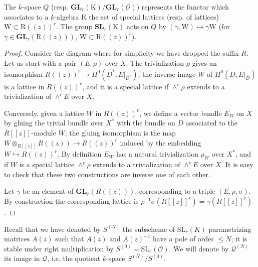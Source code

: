 \documentclass[12pt]{article}
\begin{document}
\begin{proposition}
    The $k$-space $Q$ (resp. $\mathbf{GL}_r(\mathrm{K})/\mathbf{GL}_r(\mathcal{O})$) represents the functor which associates to a $k$-algebra $\mathrm{R}$ the set of special lattices (resp. of lattices) $\mathrm{W} \subset \mathrm{R}((z))^r$. The group $\mathbf{SL}_r(\mathrm{K})$ acts on $Q$ by $(\gamma, \mathrm{W}) \mapsto \gamma \mathrm{W}$ (for $\gamma \in \mathbf{GL}_r(\mathrm{R}((z)))$, $\mathrm{W} \subset \mathrm{R}((z))^r$).
\end{proposition}

\begin{center}
\end{center}

\begin{proof}
    Consider the diagram where for simplicity we have dropped the suffix $R$. Let us start with a pair $(E, \rho)$ over $X$. The trivialization $\rho$ gives an isomorphism $R((z))^r \longrightarrow H^0(D^*, E|_{D^*})$; the inverse image $W$ of $H^0(D, E|_{D})$ is a lattice in $R((z))^r$, and it is a special lattice if $\wedge^r \rho$ extends to a trivialization of $\wedge^r E$ over $X$.

    Conversely, given a lattice $W$ in $R((z))^r$, we define a vector bundle $E_W$ on $X$ by gluing the trivial bundle over $X^*$ with the bundle on $D$ associated to the $R[[z]]$-module $W$; the gluing isomorphism is the map $W \otimes_{R[[z]]} R((z)) \longrightarrow R((z))^r$ induced by the embedding $W \hookrightarrow R((z))^r$. By definition $E_W$ has a natural trivialization $\rho_W$ over $X^*$, and if $W$ is a special lattice $\wedge^r \rho$ extends to a trivialization of $\wedge^r E$ over $X$. It is easy to check that these two constructions are inverse one of each other.

    Let $\gamma$ be an element of $\mathbf{GL}_r(R((z)))$, corresponding to a triple $(E, \rho, \sigma)$. By construction the corresponding lattice is $\rho^{-1} \sigma(R[[z]]^r) = \gamma(R[[z]]^r)$.
\end{proof}

Recall that we have denoted by $S^{(N)}$ the subscheme of $\mathrm{SL}_r(K)$ parametrizing matrices $A(z)$ such that $A(z)$ and $A(z)^{-1}$ have a pole of order $\leq N$; it is stable under right multiplication by $S^{(0)} = \mathrm{SL}_r(\mathcal{O})$. We will denote by $\mathcal{Q}^{(N)}$ its image in $\mathcal{Q}$, i.e. the quotient $k$-space $S^{(N)}/S^{(0)}$.
\end{document}
